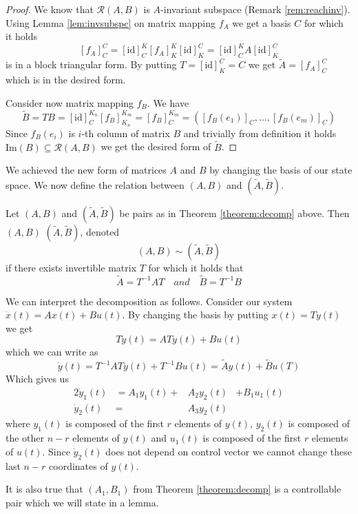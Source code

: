 \begin{proof}
	We know that $\mathcal{R}(A,B)$ is $A$-invariant subspace (Remark \ref{rem:reachinv}). Using Lemma \ref{lem:invsubspc} on matrix mapping $f_A$ we get a basis $C$ for which it holds $$[f_A]^C_C=[\text{id}]^K_C[f_A]^K_K[\text{id}]^C_K=[\text{id}]^K_CA[\text{id}]^C_K$$ is in a block triangular form. By putting $T=[\text{id}]^C_K=C$ we get $\widetilde{A}=[f_A]^C_C$ which is in the desired form.

	Consider now matrix mapping $f_B$. We have $$\widetilde{B}=TB=[\text{id}]^{K_n}_C[f_B]^{K_m}_{K_n}=[f_B]^{K_m}_C=([f_B(e_1)]_C,\ldots,[f_B(e_m)]_C)$$ Since $f_B(e_i)$ is $i$-th column of matrix $B$ and trivially from definition it holds $\text{Im}(B)\subseteq \mathcal{R}(A,B)$ we get the desired form of $\widetilde{B}$.
\end{proof}

We achieved the new form of matrices $A$ and $B$ by changing the basis of our state space. We now define the relation between $(A,B)$ and $(\widetilde{A},\widetilde{B}).$

\begin{definition}
	Let $(A,B)$ and $(\widetilde{A},\widetilde{B})$ be pairs as in Theorem \ref{theorem:decomp} above. Then $(A,B)$  $(\widetilde{A},\widetilde{B})$, denoted $$(A,B) \sim (\widetilde{A},\widetilde{B})$$ if there exists invertible matrix $T$ for which it holds that $$\widetilde{A}=T^{-1}AT\quad and\quad\widetilde{B}=T^{-1}B$$
\end{definition}

We can interpret the decomposition as follows. Consider our system $\dot{x}(t)=Ax(t)+Bu(t)$. By changing the basis by putting $x(t)=Ty(t)$ we get $$T\dot{y}(t)=ATy(t)+Bu(t)$$ which we can write as $$\dot{y}(t)=T^{-1}ATy(t)+T^{-1}Bu(t)=\widetilde{A}y(t)+\widetilde{B}u(T)$$ Which gives us 
\begin{alignat*}{2}
	\dot{y}_1(t)&=A_1y_1(t)+&A_2y_2(t)&+B_1u_1(t) \\
	\dot{y}_2(t)&=&A_3y_2(t)&
\end{alignat*}
where $y_1(t)$ is composed of the first $r$ elements of $y(t)$, $y_2(t)$ is composed of the other $n-r$ elements of $y(t)$ and $u_1(t)$ is composed of the first $r$ elements of $u(t)$. Since $\dot{y}_2(t)$ does not depend on control vector we cannot change these last $n-r$ coordinates of $y(t)$.

It is also true that $(A_1,B_1)$ from Theorem \ref{theorem:decomp} is a controllable pair which we will state in a lemma.

